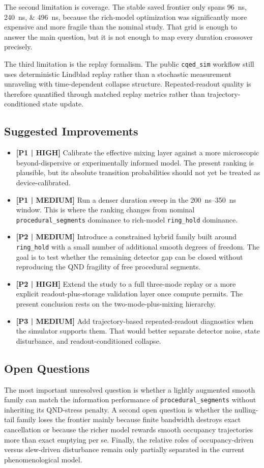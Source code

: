 \documentclass[11pt, a4paper]{article}
\begin{document}
The second limitation is coverage. The stable saved frontier only spans
\SIlist{96;240;496}{ns}, because the rich-model optimization was significantly more
expensive and more fragile than the nominal study. That grid is enough to answer the main
question, but it is not enough to map every duration crossover precisely.

The third limitation is the replay formalism. The public \texttt{cqed\_sim} workflow still
uses deterministic Lindblad replay rather than a stochastic measurement unraveling with
time-dependent collapse structure. Repeated-readout quality is therefore quantified through
matched replay metrics rather than trajectory-conditioned state update.

\subsection{Suggested Improvements}
\begin{itemize}
  \item \textbf{[P1 | HIGH]} Calibrate the effective mixing layer against a more microscopic
  beyond-dispersive or experimentally informed model. The present ranking is plausible, but
  its absolute transition probabilities should not yet be treated as device-calibrated.
  \item \textbf{[P1 | MEDIUM]} Run a denser duration sweep in the \SIrange{200}{350}{ns}
  window. This is where the ranking changes from nominal \texttt{procedural\_segments}
  dominance to rich-model \texttt{ring\_hold} dominance.
  \item \textbf{[P2 | MEDIUM]} Introduce a constrained hybrid family built around
  \texttt{ring\_hold} with a small number of additional smooth degrees of freedom. The goal
  is to test whether the remaining detector gap can be closed without reproducing the QND
  fragility of free procedural segments.
  \item \textbf{[P2 | HIGH]} Extend the study to a full three-mode replay or a more explicit
  readout-plus-storage validation layer once compute permits. The present conclusion rests
  on the two-mode-plus-mixing hierarchy.
  \item \textbf{[P3 | MEDIUM]} Add trajectory-based repeated-readout diagnostics when the
  simulator supports them. That would better separate detector noise, state disturbance,
  and readout-conditioned collapse.
\end{itemize}

\subsection{Open Questions}
The most important unresolved question is whether a lightly augmented smooth family can
match the information performance of \texttt{procedural\_segments} without inheriting its
QND-stress penalty. A second open question is whether the nulling-tail family loses the
frontier mainly because finite bandwidth destroys exact cancellation or because the richer
model rewards smooth occupancy trajectories more than exact emptying per se. Finally, the
relative roles of occupancy-driven versus slew-driven disturbance remain only partially
separated in the current phenomenological model.



\end{document}
